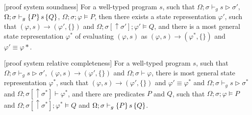\begin{theorem}\label{thm:proof-soundness}[proof system soundness]\rm 
For a well-typed program $s$, such that $\Omega;\sigma\vdash_g s \triangleright \sigma'$, $\Omega;\sigma\vdash_{g}\{P\}\, s \,\{Q\}$, $\Omega;\sigma;\varphi\models P$, then there exists a state representation $\varphi'$, such that $(\varphi,s)\longrightarrow (\varphi',\{\})$ and $\Omega;\sigma[\uparrow\sigma'];\varphi'\models Q$, and there is a most general state representation $\varphi^*$ of evaluating $(\varphi,s)$ as $(\varphi,s)\longrightarrow (\varphi^*,\{\})$ and $\varphi' \equiv \varphi*$.
\end{theorem}

\begin{theorem}\label{thm:proof-completeness}[proof system relative completeness]\rm 
For a well-typed program $s$, such that $\Omega;\sigma\vdash_g s \triangleright \sigma'$, $(\varphi,s)\longrightarrow (\varphi',\{\})$ and $\Omega;\sigma\vdash \varphi$, there is most general state representation $\varphi^*$, such that $(\varphi,s)\longrightarrow (\varphi',\{\})$ and $\varphi' \equiv \varphi^*$ and $\Omega;\sigma\vdash_g s \triangleright \sigma^*$ and $\Omega;\sigma[\uparrow \sigma^*]\vdash \varphi^*$, and there are predicates $P$ and $Q$, such that $\Omega;\sigma;\varphi\models P$ and $\Omega;\sigma[\uparrow\sigma^*];\varphi^* \models Q$ and $\Omega;\sigma\vdash_{g}\{P\}\, s \,\{Q\}$.
\end{theorem}




